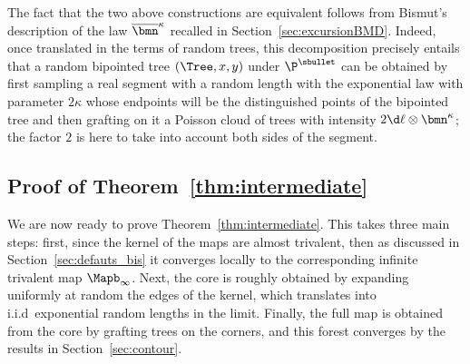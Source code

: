 The fact that the two above constructions are equivalent follows from Bismut's description of the law $ \overline{\bmn}^{\kappa}$ recalled in Section~\ref{sec:excursionBMD}. Indeed, once translated in the terms of random trees, this decomposition precisely entails that a random bipointed tree $(\Tree,x,y)$ under $\P^{\sbullet}$ can be obtained by first sampling a real segment with a random length with the exponential law with parameter $2 \kappa$ whose endpoints will be the distinguished points of the bipointed tree and then grafting on it a Poisson cloud of trees with intensity $ 2\d \ell \otimes \bmn^{\kappa}$; the factor $2$ is here to take into account both sides of the segment.

\subsection{Proof of Theorem~\ref{thm:intermediate}}

We are now ready to prove Theorem~\ref{thm:intermediate}. This takes three main steps: first, since the kernel of the maps are almost trivalent, then as discussed in Section~\ref{sec:defauts_bis} it converges locally to the corresponding infinite trivalent map $\Mapb_\infty$. Next, the core is roughly obtained by expanding uniformly at random the edges of the kernel, which translates into i.i.d~exponential random lengths in the limit. Finally, the full map is obtained from the core by grafting trees on the corners, and this forest converges by the results in Section~\ref{sec:contour}.

